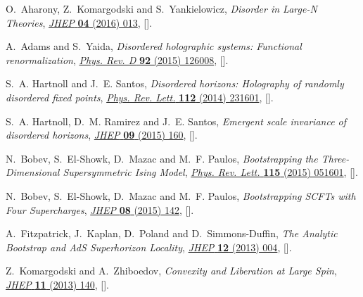 \begin{thebibliography}{10}
O.~Aharony, Z.~Komargodski and S.~Yankielowicz, \emph{{Disorder in Large-N
  Theories}}, \href{http://dx.doi.org/10.1007/JHEP04(2016)013}{\emph{JHEP}
  {\bfseries 04} (2016) 013},
  [\href{https://arxiv.org/abs/1509.02547}{{}}].

A.~Adams and S.~Yaida, \emph{{Disordered holographic systems: Functional
  renormalization}},
  \href{http://dx.doi.org/10.1103/PhysRevD.92.126008}{\emph{Phys. Rev. D}
  {\bfseries 92} (2015) 126008},
  [\href{https://arxiv.org/abs/1102.2892}{{}}].

S.~A. Hartnoll and J.~E. Santos, \emph{{Disordered horizons: Holography of
  randomly disordered fixed points}},
  \href{http://dx.doi.org/10.1103/PhysRevLett.112.231601}{\emph{Phys. Rev.
  Lett.} {\bfseries 112} (2014) 231601},
  [\href{https://arxiv.org/abs/1402.0872}{{}}].

S.~A. Hartnoll, D.~M. Ramirez and J.~E. Santos, \emph{{Emergent scale
  invariance of disordered horizons}},
  \href{http://dx.doi.org/10.1007/JHEP09(2015)160}{\emph{JHEP} {\bfseries 09}
  (2015) 160}, [\href{https://arxiv.org/abs/1504.03324}{{}}].

N.~Bobev, S.~El-Showk, D.~Mazac and M.~F. Paulos, \emph{{Bootstrapping the
  Three-Dimensional Supersymmetric Ising Model}},
  \href{http://dx.doi.org/10.1103/PhysRevLett.115.051601}{\emph{Phys. Rev.
  Lett.} {\bfseries 115} (2015) 051601},
  [\href{https://arxiv.org/abs/1502.04124}{{}}].

N.~Bobev, S.~El-Showk, D.~Mazac and M.~F. Paulos, \emph{{Bootstrapping SCFTs
  with Four Supercharges}},
  \href{http://dx.doi.org/10.1007/JHEP08(2015)142}{\emph{JHEP} {\bfseries 08}
  (2015) 142}, [\href{https://arxiv.org/abs/1503.02081}{{}}].

A.~Fitzpatrick, J.~Kaplan, D.~Poland and D.~Simmons-Duffin, \emph{{The Analytic
  Bootstrap and AdS Superhorizon Locality}},
  \href{http://dx.doi.org/10.1007/JHEP12(2013)004}{\emph{JHEP} {\bfseries 12}
  (2013) 004}, [\href{https://arxiv.org/abs/1212.3616}{{}}].

Z.~Komargodski and A.~Zhiboedov, \emph{{Convexity and Liberation at Large
  Spin}}, \href{http://dx.doi.org/10.1007/JHEP11(2013)140}{\emph{JHEP}
  {\bfseries 11} (2013) 140},
  [\href{https://arxiv.org/abs/1212.4103}{{}}].


\end{thebibliography}
